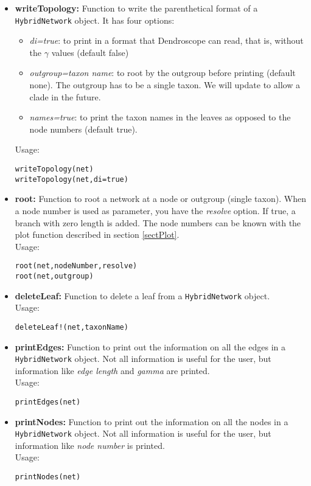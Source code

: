\documentclass[12pt]{article}
\begin{document}
\begin{itemize}
\item \textbf{writeTopology:} Function to write the parenthetical
  format of a \texttt{HybridNetwork} object. It has four options:
\begin{itemize}
\item{\textit{di=true}: to print in a format that Dendroscope can
    read, that is, without the $\gamma$ values (default
  false)}
\item{\textit{outgroup=taxon name}: to root by the outgroup before
    printing (default none). The outgroup has to be a single taxon. We will update to
  allow a clade in the future.}
\item{\textit{names=true}: to print the taxon names in the leaves as opposed to
  the node numbers (default true).}
\end{itemize}
Usage:
\begin{lstlisting}
writeTopology(net)
writeTopology(net,di=true)
\end{lstlisting}

\item \textbf{root:} Function to root a network at a node or outgroup
  (single taxon). When a node number is used as parameter, you have
  the \textit{resolve} option. If true, a branch with zero length is
  added. The node numbers can be known with the plot function
  described in section \ref{sectPlot}.\\
Usage:
\begin{lstlisting}
root(net,nodeNumber,resolve)
root(net,outgroup)
\end{lstlisting}

\item \textbf{deleteLeaf:} Function to delete a leaf from a
  \texttt{HybridNetwork} object.\\
Usage:
\begin{lstlisting}
deleteLeaf!(net,taxonName)
\end{lstlisting}


\item \textbf{printEdges:} Function to print out the information on
  all the edges in a
  \texttt{HybridNetwork} object. Not all information is useful for the
  user, but information like \textit{edge length} and \textit{gamma}
  are printed.\\
Usage:
\begin{lstlisting}
printEdges(net)
\end{lstlisting}


\item \textbf{printNodes:} Function to print out the information on
  all the nodes in a
  \texttt{HybridNetwork} object. Not all information is useful for the
  user, but information like \textit{node number}
  is printed.\\
Usage:
\begin{lstlisting}
printNodes(net)
\end{lstlisting}

\end{itemize}
\end{document}

